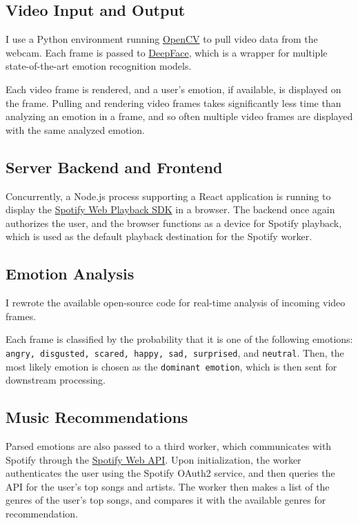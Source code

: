 \documentclass{article}
\renewcommand{\_}[1]{\underline{ #1 }}
\theoremstyle{definition}
\begin{document}
\subsection[Video Input and Output]{Video Input and Output}

I use a Python environment running \href{https://pypi.org/project/opencv-python/}{OpenCV} to pull video data from the webcam. Each frame is passed to \href{https://pypi.org/project/deepface/}{DeepFace}, which is a wrapper for multiple state-of-the-art emotion recognition models.

Each video frame is rendered, and a user's emotion, if available, is displayed on the frame. Pulling and rendering video frames takes significantly less time than analyzing an emotion in a frame, and so often multiple video frames are displayed with the same analyzed emotion.

\subsection[Server Backend and Frontend]{Server Backend and Frontend}

Concurrently, a Node.js process supporting a React application is running to display the \href{https://developer.spotify.com/documentation/web-playback-sdk/}{Spotify Web Playback SDK} in a browser. The backend once again authorizes the user, and the browser functions as a device for Spotify playback, which is used as the default playback destination for the Spotify worker. 

\subsection[Emotion Analysis]{Emotion Analysis}

I rewrote the available open-source code for real-time analysis of incoming video frames. 

Each frame is classified by the probability that it is one of the following emotions: \texttt{angry, disgusted, scared, happy, sad, surprised}, and \texttt{neutral}. Then, the most likely emotion is chosen as the \texttt{dominant emotion}, which is then sent for downstream processing.

\subsection[Music Recommendations]{Music Recommendations}

Parsed emotions are also passed to a third worker, which communicates with Spotify through the \href{https://developer.spotify.com/documentation/web-api/}{Spotify Web API}. Upon initialization, the worker authenticates the user using the Spotify OAuth2 service, and then queries the API for the user's top songs and artists. The worker then makes a list of the genres of the user's top songs, and compares it with the available genres for recommendation.
\end{document}
